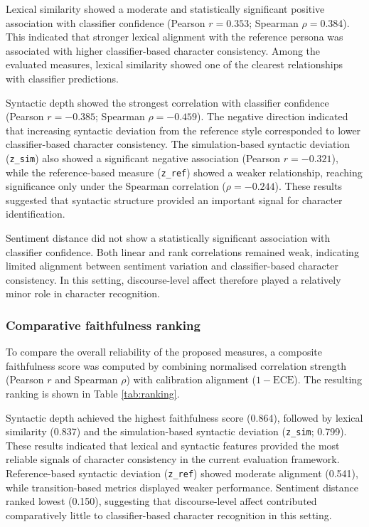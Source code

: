 \documentclass{article}
\begin{document}
Lexical similarity showed a moderate and statistically significant positive association with classifier confidence (Pearson $r=0.353$; Spearman $\rho=0.384$). This indicated that stronger lexical alignment with the reference persona was associated with higher classifier-based character consistency. Among the evaluated measures, lexical similarity showed one of the clearest relationships with classifier predictions.

Syntactic depth showed the strongest correlation with classifier confidence (Pearson $r=-0.385$; Spearman $\rho=-0.459$). The negative direction indicated that increasing syntactic deviation from the reference style corresponded to lower classifier-based character consistency. The simulation-based syntactic deviation (\texttt{z\_sim}) also showed a significant negative association (Pearson $r=-0.321$), while the reference-based measure (\texttt{z\_ref}) showed a weaker relationship, reaching significance only under the Spearman correlation ($\rho=-0.244$). These results suggested that syntactic structure provided an important signal for character identification.

Sentiment distance did not show a statistically significant association with classifier confidence. Both linear and rank correlations remained weak, indicating limited alignment between sentiment variation and classifier-based character consistency. In this setting, discourse-level affect therefore played a relatively minor role in character recognition.


\subsubsection{Comparative faithfulness ranking}  \label{sec:results_validation_ranking}

To compare the overall reliability of the proposed measures, a composite faithfulness score was computed by combining normalised correlation strength (Pearson $r$ and Spearman $\rho$) with calibration alignment ($1-\text{ECE}$). The resulting ranking is shown in Table \ref{tab:ranking}.

Syntactic depth achieved the highest faithfulness score (0.864), followed by lexical similarity (0.837) and the simulation-based syntactic deviation (\texttt{z\_sim}; 0.799). These results indicated that lexical and syntactic features provided the most reliable signals of character consistency in the current evaluation framework. Reference-based syntactic deviation (\texttt{z\_ref}) showed moderate alignment (0.541), while transition-based metrics displayed weaker performance. Sentiment distance ranked lowest (0.150), suggesting that discourse-level affect contributed comparatively little to classifier-based character recognition in this setting.
\end{document}
